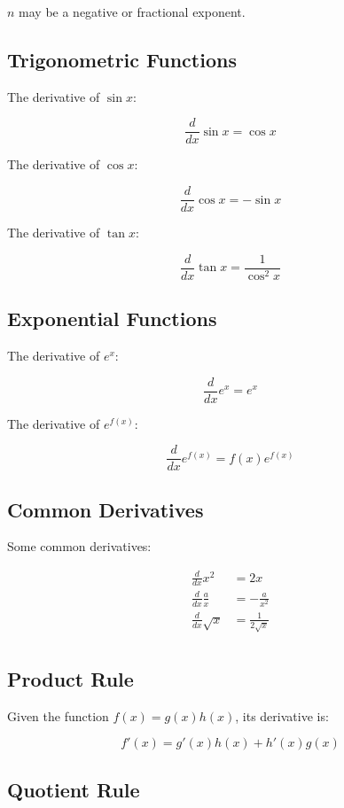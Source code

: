 \documentclass[a4paper,11pt]{article}
\begin{document}
$n$ may be a negative or fractional exponent.


\subsection{Trigonometric Functions}

The derivative of $\sin{x}$:

$$
\frac{d}{dx} \sin{x} = \cos{x}
$$

The derivative of $\cos{x}$:

$$
\frac{d}{dx} \cos{x} = -\sin{x}
$$

The derivative of $\tan{x}$:

$$
\frac{d}{dx} \tan{x} = \frac{1}{\cos^2{x}}
$$



\subsection{Exponential Functions}

The derivative of $e^x$:

$$
\frac{d}{dx} e^x = e^x
$$

The derivative of $e^{f(x)}$:

$$
\frac{d}{dx} e^{f(x)} = f(x)e^{f(x)}
$$


\subsection{Common Derivatives}

Some common derivatives:

$$
\begin{aligned}
\frac{d}{dx} x^2 & = 2x \\
\frac{d}{dx} \frac{a}{x} & = -\frac{a}{x^2} \\
\frac{d}{dx} \sqrt{x} & = \frac{1}{2\sqrt{x}} \\
\end{aligned}
$$


\subsection{Product Rule}

Given the function $f(x) = g(x) h(x)$, its derivative is:

$$
f'(x) = g'(x) h(x) + h'(x) g(x)
$$


\subsection{Quotient Rule}
\end{document}
